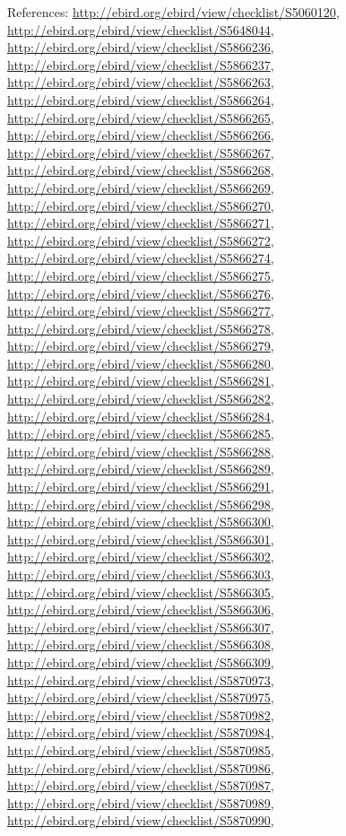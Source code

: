 \documentclass[9pt, article]{memoir}
\begin{document}
\begin{multicols}{2}
\vspace{6pt}References: 
\url{http://ebird.org/ebird/view/checklist/S5060120}, 
\url{http://ebird.org/ebird/view/checklist/S5648044}, 
\url{http://ebird.org/ebird/view/checklist/S5866236}, 
\url{http://ebird.org/ebird/view/checklist/S5866237}, 
\url{http://ebird.org/ebird/view/checklist/S5866263}, 
\url{http://ebird.org/ebird/view/checklist/S5866264}, 
\url{http://ebird.org/ebird/view/checklist/S5866265}, 
\url{http://ebird.org/ebird/view/checklist/S5866266}, 
\url{http://ebird.org/ebird/view/checklist/S5866267}, 
\url{http://ebird.org/ebird/view/checklist/S5866268}, 
\url{http://ebird.org/ebird/view/checklist/S5866269}, 
\url{http://ebird.org/ebird/view/checklist/S5866270}, 
\url{http://ebird.org/ebird/view/checklist/S5866271}, 
\url{http://ebird.org/ebird/view/checklist/S5866272}, 
\url{http://ebird.org/ebird/view/checklist/S5866274}, 
\url{http://ebird.org/ebird/view/checklist/S5866275}, 
\url{http://ebird.org/ebird/view/checklist/S5866276}, 
\url{http://ebird.org/ebird/view/checklist/S5866277}, 
\url{http://ebird.org/ebird/view/checklist/S5866278}, 
\url{http://ebird.org/ebird/view/checklist/S5866279}, 
\url{http://ebird.org/ebird/view/checklist/S5866280}, 
\url{http://ebird.org/ebird/view/checklist/S5866281}, 
\url{http://ebird.org/ebird/view/checklist/S5866282}, 
\url{http://ebird.org/ebird/view/checklist/S5866284}, 
\url{http://ebird.org/ebird/view/checklist/S5866285}, 
\url{http://ebird.org/ebird/view/checklist/S5866288}, 
\url{http://ebird.org/ebird/view/checklist/S5866289}, 
\url{http://ebird.org/ebird/view/checklist/S5866291}, 
\url{http://ebird.org/ebird/view/checklist/S5866298}, 
\url{http://ebird.org/ebird/view/checklist/S5866300}, 
\url{http://ebird.org/ebird/view/checklist/S5866301}, 
\url{http://ebird.org/ebird/view/checklist/S5866302}, 
\url{http://ebird.org/ebird/view/checklist/S5866303}, 
\url{http://ebird.org/ebird/view/checklist/S5866305}, 
\url{http://ebird.org/ebird/view/checklist/S5866306}, 
\url{http://ebird.org/ebird/view/checklist/S5866307}, 
\url{http://ebird.org/ebird/view/checklist/S5866308}, 
\url{http://ebird.org/ebird/view/checklist/S5866309}, 
\url{http://ebird.org/ebird/view/checklist/S5870973}, 
\url{http://ebird.org/ebird/view/checklist/S5870975}, 
\url{http://ebird.org/ebird/view/checklist/S5870982}, 
\url{http://ebird.org/ebird/view/checklist/S5870984}, 
\url{http://ebird.org/ebird/view/checklist/S5870985}, 
\url{http://ebird.org/ebird/view/checklist/S5870986}, 
\url{http://ebird.org/ebird/view/checklist/S5870987}, 
\url{http://ebird.org/ebird/view/checklist/S5870989}, 
\url{http://ebird.org/ebird/view/checklist/S5870990}, 

\end{multicols}
\end{document}
